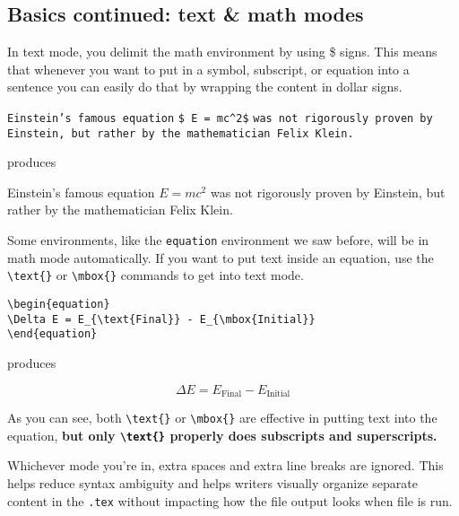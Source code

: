 \subsection{Basics continued: text \& math modes}
In text mode, you delimit the math environment by using \$ signs. This means that whenever you want to put in a symbol, subscript, or equation into a sentence you can easily do that by wrapping the content in dollar signs.
\begin{corollary}
\hfill
\begin{framed}
\texttt{Einstein's famous equation} \verb|$ E = mc^2$| \texttt{was not rigorously proven by Einstein, but rather by the mathematician Felix Klein.} 
\end{framed}
produces
\begin{framed}
Einstein's famous equation $ E = mc^2$ was not rigorously proven by Einstein, but rather by the mathematician Felix Klein. 
\end{framed}

\end{corollary}
Some environments, like the \texttt{equation} environment we saw before, will be in math mode automatically. If you want to put text inside an equation, use the \verb|\text{}| or \verb|\mbox{}| commands to get into text mode.

\begin{corollary}
\hfill
\begin{framed}
\begin{verbatim}
\begin{equation}
\Delta E = E_{\text{Final}} - E_{\mbox{Initial}}
\end{equation}
\end{verbatim}
\end{framed}
produces
\begin{framed}
\begin{equation}
\Delta E = E_{\text{Final}} - E_{\mbox{Initial}}
\end{equation}
\end{framed}
As you can see, both \verb|\text{}| or \verb|\mbox{}| are effective in putting text into the equation, { \bf but only  \verb|\text{}| properly does subscripts and superscripts.}
\end{corollary}

Whichever mode you're in, extra spaces and extra line breaks are ignored. This helps reduce syntax ambiguity and helps writers visually organize separate content in the \texttt{.tex} without impacting how the file output looks when file is run.



